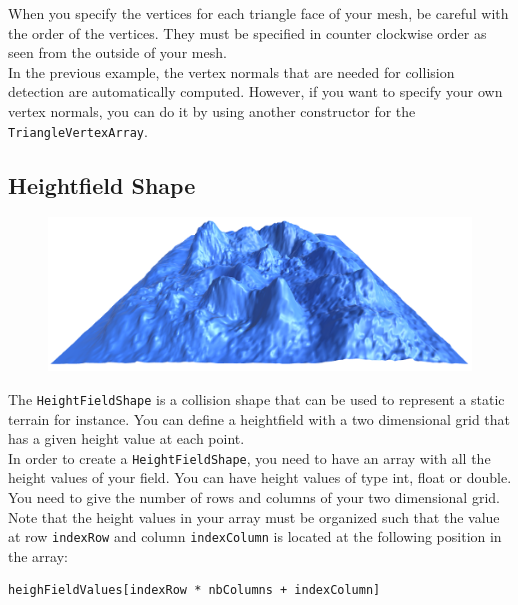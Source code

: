 \documentclass[a4paper,12pt]{article}
\begin{document}
  When you specify the vertices for each triangle face of your mesh, be careful with the order of the vertices. They must be specified in counter clockwise order
  as seen from the outside of your mesh. \\

  In the previous example, the vertex normals that are needed for collision detection are automatically computed. However, if you want to specify your own
  vertex normals, you can do it by using another constructor for the \texttt{TriangleVertexArray}. \\

  \subsection{Heightfield Shape}

  \begin{figure}[h]
      \centering
      \includegraphics{heightfieldshape.png}
      \label{fig:heightfieldshape}
  \end{figure}

  The \texttt{HeightFieldShape} is a collision shape that can be used to represent a static terrain for instance. You can
  define a heightfield with a two dimensional grid that has a given height value at each point. \\

  In order to create a \texttt{HeightFieldShape}, you need to have an array with all the height values of your field.
  You can have height values of type int, float or double. You need to give the number of rows and columns of your two
  dimensional grid. Note that the height values in your array must be organized such that the value at row
  \texttt{indexRow} and column \texttt{indexColumn} is located at the following position in the array: \\

  \begin{lstlisting}
heighFieldValues[indexRow * nbColumns + indexColumn]
  \end{lstlisting}
\end{document}
